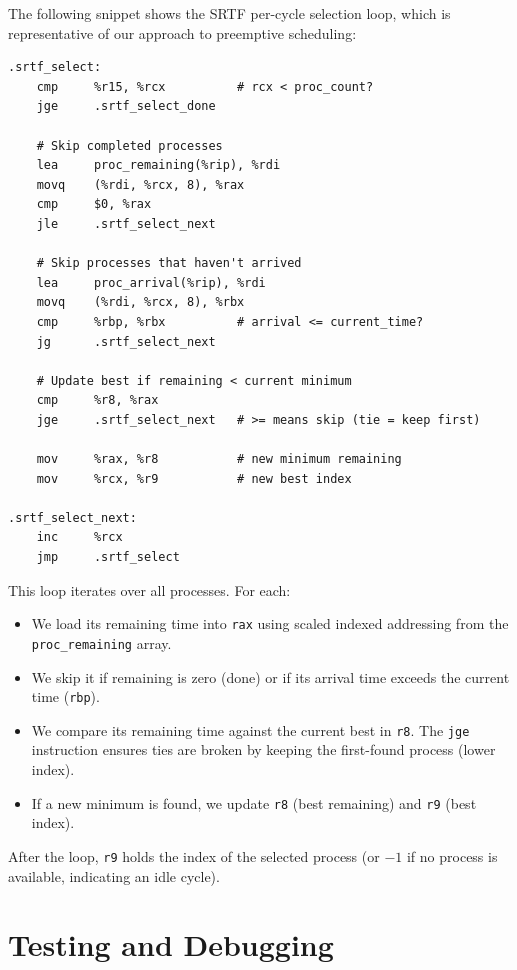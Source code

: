 \documentclass[a4paper,12pt]{article}
\begin{document}
The following snippet shows the SRTF per-cycle selection loop, which is representative of our approach to preemptive scheduling:

\begin{lstlisting}[style=AsmStyle]
.srtf_select:
    cmp     %r15, %rcx          # rcx < proc_count?
    jge     .srtf_select_done

    # Skip completed processes
    lea     proc_remaining(%rip), %rdi
    movq    (%rdi, %rcx, 8), %rax
    cmp     $0, %rax
    jle     .srtf_select_next

    # Skip processes that haven't arrived
    lea     proc_arrival(%rip), %rdi
    movq    (%rdi, %rcx, 8), %rbx
    cmp     %rbp, %rbx          # arrival <= current_time?
    jg      .srtf_select_next

    # Update best if remaining < current minimum
    cmp     %r8, %rax
    jge     .srtf_select_next   # >= means skip (tie = keep first)

    mov     %rax, %r8           # new minimum remaining
    mov     %rcx, %r9           # new best index

.srtf_select_next:
    inc     %rcx
    jmp     .srtf_select
\end{lstlisting}

This loop iterates over all processes. For each:
\begin{itemize}
    \item We load its remaining time into \texttt{rax} using scaled indexed addressing from the \texttt{proc\_remaining} array.
    \item We skip it if remaining is zero (done) or if its arrival time exceeds the current time (\texttt{rbp}).
    \item We compare its remaining time against the current best in \texttt{r8}. The \texttt{jge} instruction ensures ties are broken by keeping the first-found process (lower index).
    \item If a new minimum is found, we update \texttt{r8} (best remaining) and \texttt{r9} (best index).
\end{itemize}

After the loop, \texttt{r9} holds the index of the selected process (or $-1$ if no process is available, indicating an idle cycle).


\section{Testing and Debugging}
\end{document}
